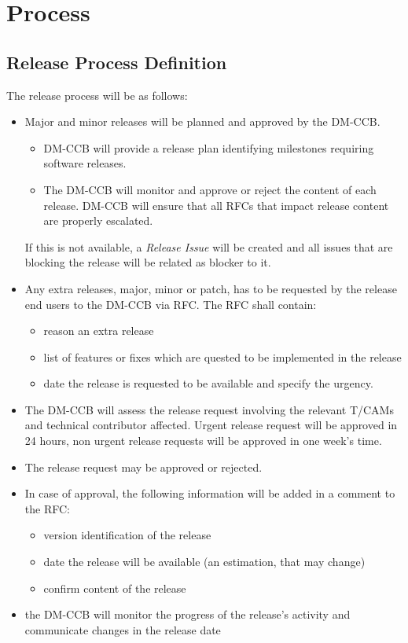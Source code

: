 \section{Process} \label{sec:process}

\subsection{Release Process Definition}

The release process will be as follows:

\begin{itemize}
\item Major and minor releases will be planned and approved by the DM-CCB.
\begin{itemize}
  \item  DM-CCB will provide  a release plan identifying  milestones requiring software releases.
  \item The DM-CCB will monitor and approve or reject the content of each release. DM-CCB will ensure that  all RFCs that impact  release content are properly escalated.
\end{itemize}
If this is not available, a \textit{Release Issue} will be created and all issues that are blocking the release will be related as blocker to it.
\item Any extra releases, major, minor or patch, has to be requested by the release end users to the DM-CCB via RFC. The RFC shall contain:
\begin{itemize}
  \item reason an extra release
  \item list of features or fixes which are quested to be implemented in the release
  \item date the release is requested to be available and specify the urgency.
\end{itemize}
\item The DM-CCB will assess the release request involving the relevant T/CAMs and technical contributor affected.
Urgent release request will be approved in 24 hours, non urgent release requests will be approved in one week's time.
\item The release request may be approved or rejected.
\item In case of approval, the following information will be added in a comment to the RFC:
\begin{itemize}
  \item version identification of the release
  \item date the release will be available (an estimation, that may change)
  \item confirm content of the release
\end{itemize}
\item the DM-CCB will monitor the progress of the release's activity and communicate changes in the release date
\end{itemize}



